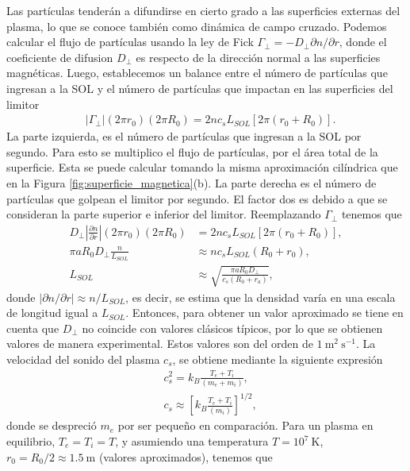 \documentclass[../main.tex]{subfiles}
\begin{document}
    Las partículas tenderán a difundirse en cierto grado a las superficies externas del plasma, lo que se conoce también como dinámica de campo cruzado. Podemos calcular el flujo de partículas usando la ley de Fick $\Gamma_{\perp} = -D_{\perp} \partial n/\partial r$, donde el coeficiente de difusion $D_{\perp}$ es respecto de la dirección normal a las superficies magnéticas. Luego, establecemos un balance entre el número de partículas que ingresan a la SOL y el número de partículas que impactan en las superficies del limitor
    \begin{align}
         &\left|\Gamma_{\perp}\right|(2\pi r_0)(2\pi R_0) = 2nc_sL_{SOL}[2\pi(r_0 + R_0)].
    \end{align}
    La parte izquierda, es el número de partículas que ingresan a la SOL por segundo. Para esto se multiplico el flujo de partículas, por el área total de la superficie. Esta se puede calcular tomando la misma aproximación cilíndrica que en la Figura \ref{fig:superficie_magnetica}(b). La parte derecha es el número de partículas que golpean el limitor por segundo. El factor dos es debido a que se consideran la parte superior e inferior del limitor. Reemplazando $\Gamma_{\perp}$ tenemos que
    \begin{align}
         D_{\perp}\left|\frac{\partial n}{\partial r} \right|(2\pi r_0)(2\pi R_0) &= 2nc_sL_{SOL}[2\pi(r_0 + R_0)], \\
         \pi a R_0 D_{\perp} \frac{n}{L_{SOL}} &\approx nc_sL_{SOL}\left(R_0+r_0\right),
         \\
         L_{SOL} &\approx \sqrt{\frac{\pi aR_0D_{\perp}}{c_s\left(R_0+r_a\right)}},
    \end{align}
    donde $\left|\partial n/\partial r\right| \approx n/L_{SOL}$, es decir, se estima que la densidad varía en una escala de longitud igual a $L_{SOL}$. Entonces, para obtener un valor aproximado se tiene en cuenta que $D_{\perp}$ no coincide con valores clásicos típicos, por lo que se obtienen valores de manera experimental. Estos valores son del orden de $\mathrm{1 \ m^2 \ s^{-1}}$. La velocidad del sonido del plasma $c_s$, se obtiene mediante la siguiente expresión
    \begin{align}
        &c_s^2 = k_B \frac{T_e + T_i}{\left(m_e+m_i\right)}, \\
        &c_s \approx \left[k_B \frac{T_e + T_i}{\left(m_i\right)}\right]^{1/2}, \label{velocidad_sonido_plasma}
    \end{align}
    donde se despreció $m_e$ por ser pequeño en comparación. Para un plasma en equilibrio, $T_e = T_i = T$, y asumiendo una temperatura $T = 10^7 \ \mathrm{K}$, $r_0 = R_0/2 \approx 1.5 \ \mathrm{m}$ (valores aproximados), tenemos que  
\end{document}
